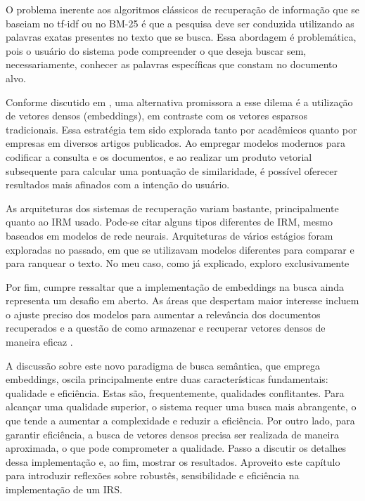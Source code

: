 \documentclass[
	12pt,				%
	openright,			%
	oneside,			%
	a4paper,			%
	english,			%
	french,				%
	spanish,			%
	brazil				%
	]{abntex2}
\begin{document}
O problema inerente aos algoritmos clássicos de recuperação de informação que se baseiam no tf-idf ou no BM-25 é que a
pesquisa deve ser conduzida utilizando as palavras exatas presentes no texto que se busca.
Essa abordagem é problemática, pois o usuário do sistema pode compreender o que deseja buscar sem, necessariamente,
conhecer as palavras específicas que constam no documento alvo.

Conforme discutido em \cite{JurafskyMartin2023}, uma alternativa promissora a esse dilema é a utilização de vetores densos (embeddings),
em contraste com os vetores esparsos tradicionais.
Essa estratégia tem sido explorada tanto por acadêmicos quanto por empresas em diversos artigos publicados.
Ao empregar modelos modernos para codificar a consulta e os documentos, e ao realizar um produto vetorial
subsequente para calcular uma pontuação de similaridade, é possível oferecer resultados mais afinados com a intenção do usuário.

As arquiteturas dos sistemas de recuperação variam bastante, principalmente quanto ao IRM usado.
Pode-se citar alguns tipos diferentes de IRM, mesmo baseados em modelos de rede neurais.
Arquiteturas de vários estágios foram exploradas no passado, em que se utilizavam modelos diferentes para comparar e para ranquear o texto.
No meu caso, como já explicado, exploro exclusivamente

Por fim, cumpre ressaltar que a implementação de embeddings na busca ainda representa um desafio em aberto.
As áreas que despertam maior interesse incluem o ajuste preciso dos modelos para aumentar a relevância dos documentos
recuperados e a questão de como armazenar e recuperar vetores densos de maneira eficaz \cite{JurafskyMartin2023}.

A discussão sobre este novo paradigma de busca semântica, que emprega embeddings,
oscila principalmente entre duas características fundamentais: qualidade e eficiência.
Estas são, frequentemente, qualidades conflitantes.
Para alcançar uma qualidade superior,
o sistema requer uma busca mais abrangente, o que tende a aumentar a complexidade e reduzir a eficiência.
Por outro lado, para garantir eficiência, a busca de vetores densos precisa ser realizada de maneira aproximada,
o que pode comprometer a qualidade.
Passo a discutir os detalhes dessa implementação e, ao fim, mostrar os resultados.
Aproveito este capítulo para introduzir reflexões sobre robustês, sensibilidade e eficiência na implementação de um IRS.
\end{document}
